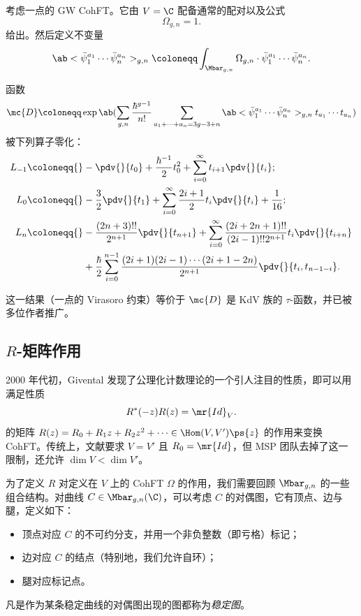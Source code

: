 \begin{exm}
    考虑一点的 GW CohFT。它由 $V = \C$ 配备通常的配对以及公式
    \[ \Omega_{g,n} = 1. \]
    给出。然后定义不变量
    \[ \ab<\bar{\psi}_1^{a_1} \cdots \bar{\psi}_n^{a_n}>_{g,n} \coloneqq \int_{\Mbar_{g,n}} \Omega_{g,n} \cdot \bar{\psi}_1^{a_1} \cdots \bar{\psi}_n^{a_n}. \]
    \begin{thm}
        函数
        \[ \mc{D} \coloneqq \exp \ab(\sum_{g,n} \frac{\hbar^{g-1}}{n!}\sum_{a_1 + \cdots + a_n = 3g-3+n} \ab<\bar{\psi}_1^{a_1} \cdots \bar{\psi}_n^{a_n}>_{g,n} t_{a_1}\cdots t_{a_n}) \]
        被下列算子零化：
        \begin{align*}
            L_{-1} \coloneqq{}& -\pdv{}{t_0} + \frac{\hbar^{-1}}{2} t_0^2 + \sum_{i=0}^{\infty} t_{i+1} \pdv{}{t_i};\\
            L_0 \coloneqq{}& -\frac{3}{2} \pdv{}{t_1} + \sum_{i=0}^{\infty} \frac{2i+1}{2} t_i \pdv{}{t_i} + \frac{1}{16};\\
            L_n \coloneqq{}& -\frac{(2n+3)!!}{2^{n+1}} \pdv{}{t_{n+1}} + \sum_{i=0}^{\infty} \frac{(2i+2n+1)!!}{(2i-1)!! 2^{n+1}} t_i \pdv{}{t_{i+n}} \\
            &+ \frac{\hbar}{2} \sum_{i=0}^{n-1} \frac{(2i+1) (2i-1) \cdots (2i+1-2n)}{2^{n+1}} \pdv{}{t_i,t_{n-1-i}}.
        \end{align*}
    \end{thm}
\end{exm}

\begin{rmk}
    这一结果（一点的 Virasoro 约束）等价于 $\mc{D}$ 是 KdV 族的 $\tau$-函数，并已被多位作者推广。
\end{rmk}



\subsection{$R$-矩阵作用}%
\label{sub:R-matrix action}

2000 年代初，Givental 发现了公理化计数理论的一个引人注目的性质，即可以用满足性质
\[ R^*(-z) R(z) = \mr{Id}_V. \]
的矩阵 $R(z) = R_0 + R_1 z + R_2 z^2 + \cdots \in \Hom(V, V')\ps{z}$ 的作用来变换 CohFT。传统上，文献要求 $V = V'$ 且 $R_0 = \mr{Id}$，但 MSP 团队去掉了这一限制，还允许 $\dim V < \dim V'$。

为了定义 $R$ 对定义在 $V$ 上的 CohFT $\Omega$ 的作用，我们需要回顾 $\Mbar_{g,n}$ 的一些组合结构。对曲线 $C\in \Mbar_{g,n}(\C)$，可以考虑 $C$ 的对偶图，它有顶点、边与腿，定义如下：
\begin{itemize}
    \item 顶点对应 $C$ 的不可约分支，并用一个非负整数（即亏格）标记；
    \item 边对应 $C$ 的结点（特别地，我们允许自环）；
    \item 腿对应标记点。
\end{itemize}
凡是作为某条稳定曲线的对偶图出现的图都称为\textit{稳定图}。

